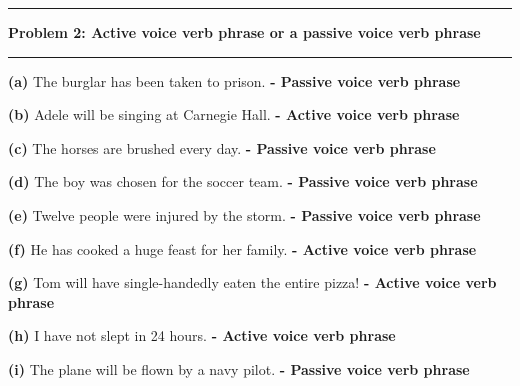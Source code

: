 \documentclass[11pt]{article}
\newcommand\question[2]{\vspace{.25in}\hrule\textbf{#1: #2}\vspace{.5em}\hrule\vspace{.10in}}
\renewcommand\part[1]{\vspace{.10in}\textbf{(#1)}}
\begin{document}
\question{Problem 2}{Active voice verb phrase or a passive voice verb phrase}

\part{a} The burglar has been taken to prison. \textbf{- Passive voice verb phrase}

\part{b} Adele will be singing at Carnegie Hall. \textbf{- Active voice verb phrase}

\part{c} The horses are brushed every day. \textbf{- Passive voice verb phrase}

\part{d} The boy was chosen for the soccer team. \textbf{- Passive voice verb phrase}

\part{e} Twelve people were injured by the storm. \textbf{- Passive voice verb phrase}

\part{f} He has cooked a huge feast for her family. \textbf{- Active voice verb phrase}

\part{g} Tom will have single-handedly eaten the entire pizza! \textbf{- Active voice verb phrase}

\part{h} I have not slept in 24 hours. \textbf{- Active voice verb phrase}

\part{i} The plane will be flown by a navy pilot. \textbf{- Passive voice verb phrase}
\end{document}
